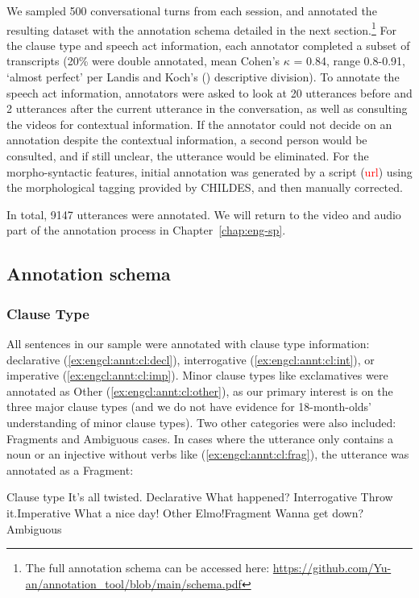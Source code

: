 We sampled 500 conversational turns from each session, and annotated the resulting dataset with the annotation schema detailed in the next section.\footnote{The full annotation schema can be accessed here: \url{https://github.com/Yu-an/annotation_tool/blob/main/schema.pdf}} For the clause type and speech act information, each annotator completed a subset of transcripts (20\% were double annotated, mean Cohen's $\kappa$ = 0.84, range 0.8-0.91, `almost perfect’ per Landis and Koch's (\cite*{landis1977iaa}) descriptive division). To annotate the speech act information, annotators were asked to look at 20 utterances before and 2 utterances after the current utterance in the conversation, as well as consulting the videos for contextual information. If the annotator could not decide on an annotation despite the contextual information, a second person would be consulted, and if still unclear, the utterance would be eliminated. For the morpho-syntactic features, initial annotation was generated by a script (\textcolor{red}{url}) using the morphological tagging provided by CHILDES, and then manually corrected. 

In total, 9147 utterances were annotated. We will return to the video and audio part of the annotation process in Chapter~\ref{chap:eng-sp}.




\subsection{Annotation schema}
\label{sec:engcl:corpus:schema}

\subsubsection{Clause Type}

All sentences in our sample were annotated with clause type information: declarative (\ref{ex:engcl:annt:cl:decl}), interrogative (\ref{ex:engcl:annt:cl:int}), or imperative (\ref{ex:engcl:annt:cl:imp}). Minor clause types like exclamatives were annotated as Other (\ref{ex:engcl:annt:cl:other}), as our primary interest is on the three major clause types (and we do not have evidence for 18-month-olds' understanding of minor clause types). Two other categories were also included: Fragments and Ambiguous cases. In cases where the utterance only contains a noun or an injective without verbs like (\ref{ex:engcl:annt:cl:frag}), the utterance was annotated as a Fragment: 

Clause type
\bxl
\label{ex:engcl:annt:cl:decl}
It’s all twisted. \hfill Declarative
\ex \label{ex:engcl:annt:cl:int} What happened?	\hfill Interrogative
\ex \label{ex:engcl:annt:cl:imp} Throw it.\hfill Imperative
\ex \label{ex:engcl:annt:cl:other} What a nice day! \hfill Other
\ex \label{ex:engcl:annt:cl:frag}	Elmo!\hfill	Fragment
\ex \label{ex:engcl:annt:cl:amb} Wanna get down?	\hfill Ambiguous
\exl
\eex

